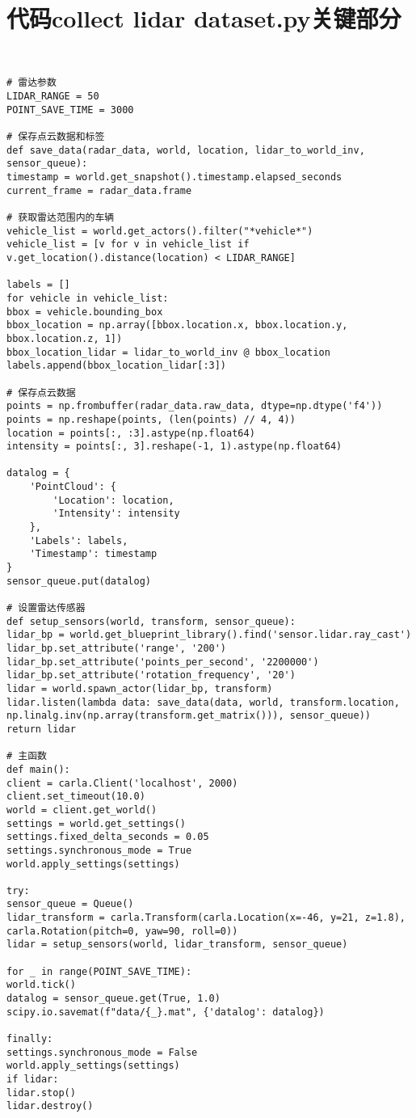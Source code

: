\section{代码collect lidar dataset.py关键部分}


\begin{lstlisting}
	

# 雷达参数
LIDAR_RANGE = 50
POINT_SAVE_TIME = 3000

# 保存点云数据和标签
def save_data(radar_data, world, location, lidar_to_world_inv, sensor_queue):
timestamp = world.get_snapshot().timestamp.elapsed_seconds
current_frame = radar_data.frame

# 获取雷达范围内的车辆
vehicle_list = world.get_actors().filter("*vehicle*")
vehicle_list = [v for v in vehicle_list if v.get_location().distance(location) < LIDAR_RANGE]

labels = []
for vehicle in vehicle_list:
bbox = vehicle.bounding_box
bbox_location = np.array([bbox.location.x, bbox.location.y, bbox.location.z, 1])
bbox_location_lidar = lidar_to_world_inv @ bbox_location
labels.append(bbox_location_lidar[:3])

# 保存点云数据
points = np.frombuffer(radar_data.raw_data, dtype=np.dtype('f4'))
points = np.reshape(points, (len(points) // 4, 4))
location = points[:, :3].astype(np.float64)
intensity = points[:, 3].reshape(-1, 1).astype(np.float64)

datalog = {
	'PointCloud': {
		'Location': location,
		'Intensity': intensity
	},
	'Labels': labels,
	'Timestamp': timestamp
}
sensor_queue.put(datalog)

# 设置雷达传感器
def setup_sensors(world, transform, sensor_queue):
lidar_bp = world.get_blueprint_library().find('sensor.lidar.ray_cast')
lidar_bp.set_attribute('range', '200')
lidar_bp.set_attribute('points_per_second', '2200000')
lidar_bp.set_attribute('rotation_frequency', '20')
lidar = world.spawn_actor(lidar_bp, transform)
lidar.listen(lambda data: save_data(data, world, transform.location, np.linalg.inv(np.array(transform.get_matrix())), sensor_queue))
return lidar

# 主函数
def main():
client = carla.Client('localhost', 2000)
client.set_timeout(10.0)
world = client.get_world()
settings = world.get_settings()
settings.fixed_delta_seconds = 0.05
settings.synchronous_mode = True
world.apply_settings(settings)

try:
sensor_queue = Queue()
lidar_transform = carla.Transform(carla.Location(x=-46, y=21, z=1.8), carla.Rotation(pitch=0, yaw=90, roll=0))
lidar = setup_sensors(world, lidar_transform, sensor_queue)

for _ in range(POINT_SAVE_TIME):
world.tick()
datalog = sensor_queue.get(True, 1.0)
scipy.io.savemat(f"data/{_}.mat", {'datalog': datalog})

finally:
settings.synchronous_mode = False
world.apply_settings(settings)
if lidar:
lidar.stop()
lidar.destroy()


	
\end{lstlisting}


